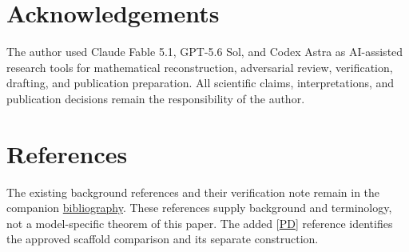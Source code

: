 \documentclass[
  11pt,
  a4paper,
]{article}
\begin{document}
\section{Acknowledgements}\label{acknowledgements}

The author used Claude Fable 5.1, GPT-5.6 Sol, and Codex Astra as AI-assisted research tools for mathematical reconstruction, adversarial review, verification, drafting, and publication preparation. All scientific claims, interpretations, and publication decisions remain the responsibility of the author.


\begingroup\fontsize{10}{12}\selectfont

\section{References}\label{references}

The existing background references and their verification note remain in the companion \href{../../PAPER_C_REFERENCES_v0.2.md}{bibliography}. These references supply background and terminology, not a model-specific theorem of this paper. The added {[}\hyperlink{ref-PD}{PD}{]} reference identifies the approved scaffold comparison and its separate construction.
\end{document}
